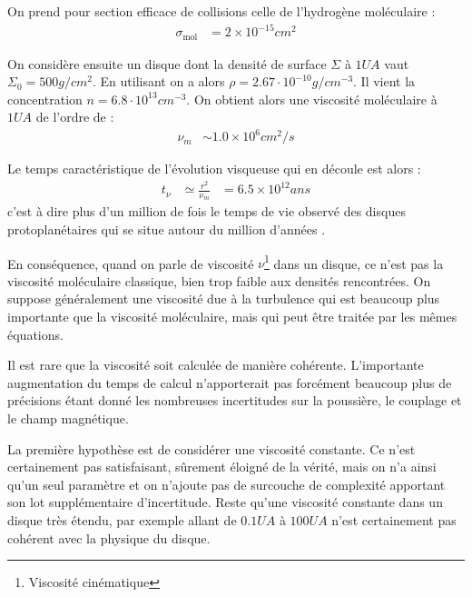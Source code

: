 On prend pour section efficace de collisions celle de l'hydrogène moléculaire \citep{chapman1970mathematical} :
\begin{align}
\sigma_\text{mol} &= 2\times 10^{-15}\unit{cm^2}
\end{align}

On considère ensuite un disque dont la densité de surface $\Sigma$ à $1\unit{UA}$ vaut $\Sigma_0 = 500\unit{g/cm^2}$. En utilisant  on a alors $\rho=2.67\cdot 10^{-10}\unit{g/cm^{-3}}$. Il vient la concentration $n=6.8\cdot 10^{13}\unit{cm^{-3}}$. On obtient alors une viscosité moléculaire à $1\unit{UA}$ de l'ordre de : 
\begin{align}
\nu_m &\sim 1.0\times 10^6\unit{cm^2/s}
\end{align}

Le temps caractéristique de l'évolution visqueuse qui en découle est alors : 
\begin{align}
t_\nu &\simeq \frac{r^2}{\nu_m} &= 6.5\times 10^{12}\unit{ans}
\end{align}
c'est à dire plus d'un million de fois le temps de vie observé des disques protoplanétaires qui se situe autour du million d'années \citep{williams2011protoplanetary}.

En conséquence, quand on parle de viscosité $\nu$\footnote{Viscosité cinématique} dans un disque, ce n'est pas la viscosité moléculaire classique, bien trop faible aux densités rencontrées. On suppose généralement une viscosité due à la turbulence qui est beaucoup plus importante que la viscosité moléculaire, mais qui peut être traitée par les mêmes équations. 


Il est rare que la viscosité soit calculée de manière cohérente. L'importante augmentation du temps de calcul n'apporterait pas forcément beaucoup plus de précisions étant donné les nombreuses incertitudes sur la poussière, le couplage et le champ magnétique. 

\bigskip

La première hypothèse est de considérer une viscosité constante. Ce n'est certainement pas satisfaisant, sûrement éloigné de la vérité, mais on n'a ainsi qu'un seul paramètre et on n'ajoute pas de surcouche de complexité apportant son lot supplémentaire d'incertitude. Reste qu'une viscosité constante dans un disque très étendu, par exemple allant de $0.1\unit{UA}$ à $100\unit{UA}$ n'est certainement pas cohérent avec la physique du disque. 

